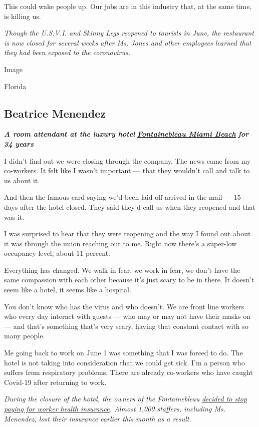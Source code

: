 This could wake people up. Our jobs are in this industry that, at the
same time, is killing us.

\emph{Though the U.S.V.I. and Skinny Legs reopened to tourists in June,
the restaurant is now closed for several weeks after Ms. Jones and other
employees learned that they had been exposed to the coronavirus.}

Image

Florida

\hypertarget{beatrice-menendez}{%
\subsection{Beatrice Menendez}\label{beatrice-menendez}}

\emph{\textbf{A room attendant at the luxury hotel}}
\textbf{\href{https://www.fontainebleau.com/}{\emph{Fontainebleau Miami
Beach}}} \emph{\textbf{for 34 years}}

I didn't find out we were closing through the company. The news came
from my co-workers. It felt like I wasn't important --- that they
wouldn't call and talk to us about it.

And then the famous card saying we'd been laid off arrived in the mail
--- 15 days after the hotel closed. They said they'd call us when they
reopened and that was it.

I was surprised to hear that they were reopening and the way I found out
about it was through the union reaching out to me. Right now there's a
super-low occupancy level, about 11 percent.

Everything has changed. We walk in fear, we work in fear, we don't have
the same compassion with each other because it's just scary to be in
there. It doesn't seem like a hotel, it seems like a hospital.

You don't know who has the virus and who doesn't. We are front line
workers who every day interact with guests --- who may or may not have
their masks on --- and that's something that's very scary, having that
constant contact with so many people.

Me going back to work on June 1 was something that I was forced to do.
The hotel is not taking into consideration that we could get sick. I'm a
person who suffers from respiratory problems. There are already
co-workers who have caught Covid-19 after returning to work.

\emph{During the closure of the hotel, the owners of the Fontainebleau}
\href{https://www.miamiherald.com/news/business/tourism-cruises/article243908132.html}{\emph{decided
to stop paying for worker health insurance}}\emph{. Almost 1,000
staffers, including Ms. Menendez, lost their insurance earlier this
month as a result.}

